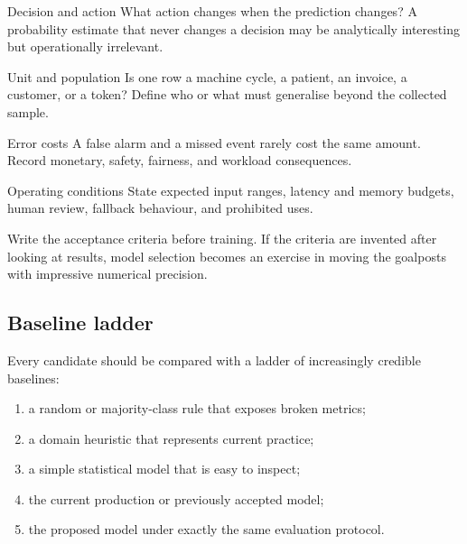 \begin{v3topic}{Decision and action}
    What action changes when the prediction changes?
    A probability estimate that never changes a decision may be analytically
    interesting but operationally irrelevant.

\end{v3topic}
\begin{v3topic}{Unit and population}
    Is one row a machine cycle, a patient, an invoice, a customer, or a token?
    Define who or what must generalise beyond the collected sample.

\end{v3topic}
\begin{v3topic}{Error costs}
    A false alarm and a missed event rarely cost the same amount.
    Record monetary, safety, fairness, and workload consequences.

\end{v3topic}
\begin{v3topic}{Operating conditions}
    State expected input ranges, latency and memory budgets, human review,
    fallback behaviour, and prohibited uses.
\end{v3topic}

\begin{engineernote}
Write the acceptance criteria before training.
If the criteria are invented after looking at results, model selection becomes
an exercise in moving the goalposts with impressive numerical precision.
\end{engineernote}

\subsection{Baseline ladder}

Every candidate should be compared with a ladder of increasingly credible
baselines:

\begin{enumerate}
    \item a random or majority-class rule that exposes broken metrics;
    \item a domain heuristic that represents current practice;
    \item a simple statistical model that is easy to inspect;
    \item the current production or previously accepted model;
    \item the proposed model under exactly the same evaluation protocol.
\end{enumerate}


